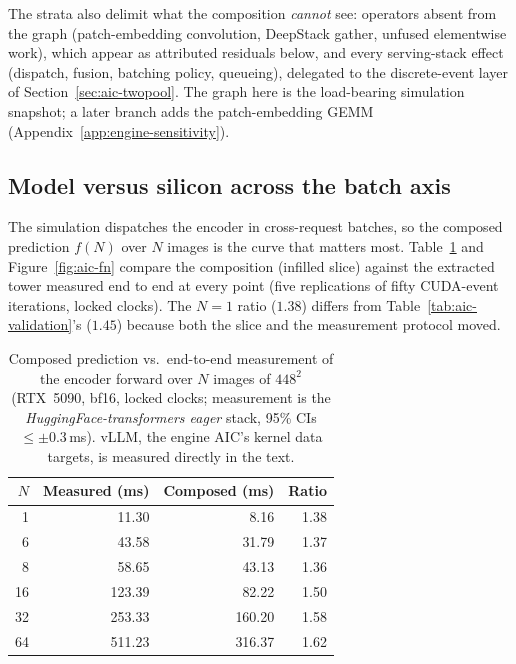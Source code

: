 The strata also delimit what the composition \emph{cannot} see: operators
absent from the graph (patch-embedding convolution, DeepStack gather,
unfused elementwise work), which appear as attributed residuals below, and
every serving-stack effect (dispatch, fusion, batching policy, queueing),
delegated to the discrete-event layer of Section~\ref{sec:aic-twopool}. The
graph here is the load-bearing simulation snapshot; a later branch adds the
patch-embedding GEMM (Appendix~\ref{app:engine-sensitivity}).

\subsection{Model versus silicon across the batch axis}
\label{sec:aic-model-vs-silicon}

The simulation dispatches the encoder in cross-request batches, so the
composed prediction $f(N)$ over $N$ images is the curve that matters most.
Table~\ref{tab:aic-fn} and Figure~\ref{fig:aic-fn} compare the composition
(infilled slice) against the extracted tower measured end to end at every
point (five replications of fifty CUDA-event iterations, locked clocks). The
$N{=}1$ ratio ($1.38$) differs from Table~\ref{tab:aic-validation}'s
($1.45$) because both the slice and the measurement protocol moved.

\begin{table}[htbp]
\centering
\caption[Composed $f(N)$ versus end-to-end encoder measurement]{Composed
prediction vs.\ end-to-end measurement of the encoder forward over $N$
images of $448^2$ (RTX~5090, bf16, locked clocks; measurement is the
\emph{HuggingFace-transformers eager} stack, 95\% CIs $\leq \pm 0.3$\,ms).
vLLM, the engine AIC's kernel data targets, is measured directly in the
text.}
\label{tab:aic-fn}
\small
\begin{tabular}{rrrr}
\toprule
$N$ & Measured (ms) & Composed (ms) & Ratio \\
\midrule
1   & 11.30  & 8.16   & 1.38 \\
6   & 43.58  & 31.79  & 1.37 \\
8   & 58.65  & 43.13  & 1.36 \\
16  & 123.39 & 82.22  & 1.50 \\
32  & 253.33 & 160.20 & 1.58 \\
64  & 511.23 & 316.37 & 1.62 \\
\bottomrule
\end{tabular}
\end{table}

